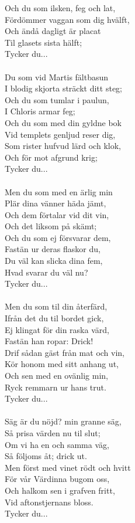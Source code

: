 Och du som ilsken, feg och lat,\\
Fördömmer vaggan som dig hvälft,\\
Och ändå dagligt är placat\\
Til glasets sista hälft;\\
Tycker du...\\
	\\		  
Du som vid Martis fältbasun\\
I blodig skjorta sträckt ditt steg;\\
Och du som tumlar i paulun,\\
I Chloris armar feg;\\
Och du som med din gyldne bok\\
Vid templets genljud reser dig,\\
Som rister hufvud lärd och klok,\\
Och för mot afgrund krig;\\
Tycker du...\\
\\
Men du som med en ärlig min\\
Plär dina vänner häda jämt,\\
Och dem förtalar vid dit vin,\\
Och det liksom på skämt;\\
Och du som ej försvarar dem,\\
Fastän ur deras flaskor du,\\
Du väl kan slicka dina fem,\\
Hvad svarar du väl nu?\\
Tycker du...\\  
\\
Men du som til din återfärd,\\
Ifrån det du til bordet gick,\\
Ej klingat för din raska värd,\\
Fastän han ropar: Drick!\\
Drif sådan gäst från mat och vin,\\
Kör honom med sitt anhang ut,\\
Och sen med en ovänlig min,\\
Ryck remmarn ur hans trut.\\
Tycker du...\\
	\\				   
Säg är du nöjd? min granne säg,\\
Så prisa värden nu til slut;\\
Om vi ha en och samma väg,\\
Så följoms åt; drick ut.\\
Men först med vinet rödt och hvitt\\
För vår Värdinna bugom oss,\\
Och halkom sen i grafven fritt,\\
Vid aftonstjernans bloss.\\
Tycker du...
